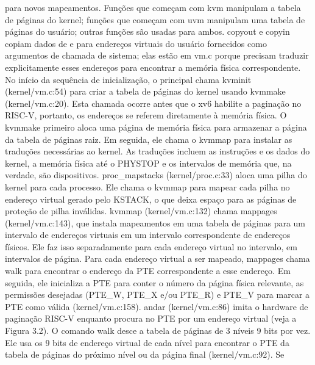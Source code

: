 para  novos  mapeamentos.  Funções  que  começam  com  kvm  manipulam  a  tabela  de  páginas  do  kernel;  funções  que  
começam  com  uvm  manipulam  uma  tabela  de  páginas  do  usuário;  outras  funções  são  usadas  para  ambos.  copyout  e  
copyin  copiam  dados  de  e  para  endereços  virtuais  do  usuário  fornecidos  como  argumentos  de  chamada  de  sistema;  elas  
estão  em  vm.c  porque  precisam  traduzir  explicitamente  esses  endereços  para  encontrar  a  memória  física  correspondente.
 No  início  da  sequência  de  inicialização,  o  principal  chama  kvminit  (kernel/vm.c:54)  para  criar  a  tabela  de  páginas  do  
kernel  usando  kvmmake  (kernel/vm.c:20).  Esta  chamada  ocorre  antes  que  o  xv6  habilite  a  paginação  no  RISC-V,  
portanto,  os  endereços  se  referem  diretamente  à  memória  física.  O  kvmmake  primeiro  aloca  uma  página  de  memória  
física  para  armazenar  a  página  da  tabela  de  páginas  raiz.  Em  seguida,  ele  chama  o  kvmmap  para  instalar  as  traduções  
necessárias  ao  kernel.  As  traduções  incluem  as  instruções  e  os  dados  do  kernel,  a  memória  física  até  o  PHYSTOP  e  os  
intervalos  de  memória  que,  na  verdade,  são  dispositivos.  proc_mapstacks  (kernel/proc.c:33)  aloca  uma  pilha  do  kernel  
para  cada  processo.  Ele  chama  o  kvmmap  para  mapear  cada  pilha  no  endereço  virtual  gerado  pelo  KSTACK,  o  que  
deixa  espaço  para  as  páginas  de  proteção  de  pilha  inválidas.
 kvmmap  (kernel/vm.c:132)  chama  mappages  (kernel/vm.c:143),  que  instala  mapeamentos  em  uma  tabela  de  
páginas  para  um  intervalo  de  endereços  virtuais  em  um  intervalo  correspondente  de  endereços  físicos.  Ele  faz  isso  
separadamente  para  cada  endereço  virtual  no  intervalo,  em  intervalos  de  página.  Para  cada  endereço  virtual  a  ser  
mapeado,  mappages  chama  walk  para  encontrar  o  endereço  da  PTE  correspondente  a  esse  endereço.  Em  
seguida,  ele  inicializa  a  PTE  para  conter  o  número  da  página  física  relevante,  as  permissões  desejadas  (PTE_W,  
PTE_X  e/ou  PTE_R)  e  PTE_V  para  marcar  a  PTE  como  válida  (kernel/vm.c:158).
 andar  (kernel/vm.c:86)  imita  o  hardware  de  paginação  RISC-V  enquanto  procura  no  PTE  por  um  endereço  virtual  
(veja  a  Figura  3.2).  O  comando  walk  desce  a  tabela  de  páginas  de  3  níveis  9  bits  por  vez.  Ele  usa  os  9  bits  de  endereço  
virtual  de  cada  nível  para  encontrar  o  PTE  da  tabela  de  páginas  do  próximo  nível  ou  da  página  final  (kernel/vm.c:92).  Se  
